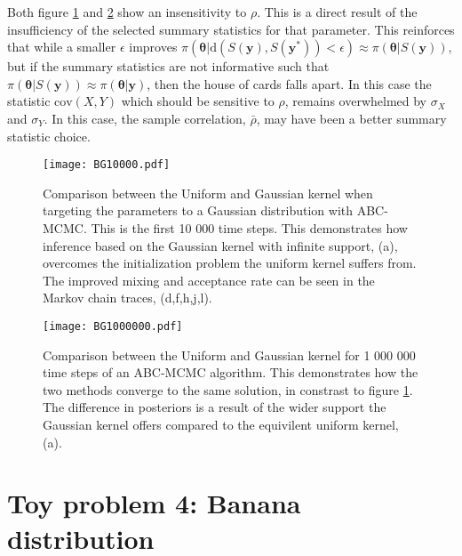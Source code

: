 Both figure \ref{KuVSKg-1} and \ref{KuVSKg-2} show an insensitivity to $\rho$. This is a direct result of the insufficiency of the selected summary statistics for that parameter. This reinforces that while a smaller $\epsilon$ improves $\pi(\bm{\theta}|\text{d}(S(\bm{y}),S(\bm{y^*}))<\epsilon) \approx \pi(\bm{\theta}|S(\bm{y}))$, but if the summary statistics are not informative such that $\pi(\bm{\theta}|S(\bm{y})) \approx \pi(\bm{\theta}|\bm{y})$, then the house of cards falls apart. In this case the statistic $\text{cov}(X,Y)$ which should be sensitive to $\rho$, remains overwhelmed by $\sigma_X$ and $\sigma_Y$. In this case, the sample correlation, $\bar{\rho}$, may have been a better summary statistic choice. 

\begin{figure}[H]
	\centering
	\texttt{[image: BG10000.pdf]}
	\caption{Comparison between the Uniform and Gaussian kernel when targeting the parameters to a Gaussian distribution with ABC-MCMC. This is the first 10 000 time steps. This demonstrates how inference based on the Gaussian kernel with infinite support, (a), overcomes the initialization problem the uniform kernel suffers from. The improved mixing and acceptance rate can be seen in the Markov chain traces, (d,f,h,j,l).}
	\label{KuVSKg-1}
\end{figure}

\begin{figure}[H]
	\centering
	\texttt{[image: BG1000000.pdf]}
	\caption{Comparison between the Uniform and Gaussian kernel for 1 000 000 time steps of an ABC-MCMC algorithm. This demonstrates how the two methods converge to the same solution, in constrast to figure \ref{KuVSKg-1}. The difference in posteriors is a result of the wider support the Gaussian kernel offers compared to the equivilent uniform kernel, (a).}
	\label{KuVSKg-2}
\end{figure} 

\section{Toy problem 4: Banana distribution}

